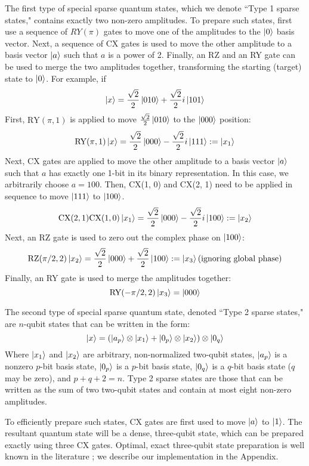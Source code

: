 \documentclass{article}
\begin{document}
The first type of special sparse quantum states, which we denote ``Type 1 sparse
states," contains exactly two non-zero
amplitudes. To prepare such states, first use a sequence of $RY(\pi)$ gates to
move one of the amplitudes to the $\mathinner{|{0}\rangle}$ basis vector. Next, a sequence of
CX gates is used to move the other amplitude to a basis vector $\mathinner{|{a}\rangle}$ such
that $a$ is a power of 2.
Finally, an RZ and an RY gate can be used to merge the two amplitudes together,
transforming the starting (target) state to $\mathinner{|{0}\rangle}$. For example, if
$$\mathinner{|{x}\rangle} = \frac{\sqrt{2}}{2}\mathinner{|{010}\rangle} + \frac{\sqrt{2}}{2}i\mathinner{|{101}\rangle}$$
First, $\text{RY}(\pi, 1)$ is applied to move 
$\frac{\sqrt{2}}{2}\mathinner{|{010}\rangle}$ to the $\mathinner{|{000}\rangle}$ position:
$$\text{RY}(\pi, 1) \mathinner{|{x}\rangle} = \frac{\sqrt{2}}{2}\mathinner{|{000}\rangle} 
- \frac{\sqrt{2}}{2}i\mathinner{|{111}\rangle} := \mathinner{|{x_1}\rangle}$$
Next, CX gates are applied to move the other amplitude to a basis vector
$\mathinner{|{a}\rangle}$ such that $a$ has exactly one 1-bit in its binary representation. In
this case, we arbitrarily choose $a = 100$. Then, CX(1, 0) and
CX(2, 1) need to be applied in sequence to move $\mathinner{|{111}\rangle}$ to $\mathinner{|{100}\rangle}$.
$$\text{CX}(2, 1) \text{CX}(1, 0) \mathinner{|{x_1}\rangle} = \frac{\sqrt{2}}{2}\mathinner{|{000}\rangle} 
- \frac{\sqrt{2}}{2}i\mathinner{|{100}\rangle} := \mathinner{|{x_2}\rangle}$$
Next, an RZ gate is used to zero out the complex phase on $\mathinner{|{100}\rangle}$:
$$\text{RZ}(\pi/2, 2)\mathinner{|{x_2}\rangle} = \frac{\sqrt{2}}{2}\mathinner{|{000}\rangle} 
+ \frac{\sqrt{2}}{2}\mathinner{|{100}\rangle} := \mathinner{|{x_3}\rangle}
\text{(ignoring global phase)}$$
Finally, an RY gate is used to merge the amplitudes together:
$$\text{RY}(-\pi/2, 2)\mathinner{|{x_3}\rangle} = \mathinner{|{000}\rangle}$$

The second type of special sparse quantum state, denoted ``Type 2 sparse states,"
are $n$-qubit states that can be written in the form:
\begin{equation} \label{type2sparse}
\mathinner{|{x}\rangle} = (\mathinner{|{a_p}\rangle} \otimes \mathinner{|{x_1}\rangle} + \mathinner{|{0_p}\rangle} \otimes \mathinner{|{x_2}\rangle})
  \otimes \mathinner{|{0_q}\rangle}
\end{equation}
Where $\mathinner{|{x_1}\rangle}$ and $\mathinner{|{x_2}\rangle}$ are arbitrary, non-normalized two-qubit states, $\mathinner{|{a_p}\rangle}$ is
a nonzero $p$-bit basis state, $\mathinner{|{0_p}\rangle}$ is a $p$-bit basis state,
$\mathinner{|{0_q}\rangle}$ is a $q$-bit basis state ($q$ may be zero), and $p + q + 2 = n$.
Type 2 sparse states are those that can be written as the sum of two two-qubit
states and contain at most eight non-zero amplitudes.

To efficiently prepare such states, CX gates are first used to move $\mathinner{|{a}\rangle}$ to
$\mathinner{|{1}\rangle}$. The resultant quantum state will be a dense, three-qubit state,
which can be prepared exactly using three CX gates. Optimal, exact three-qubit
state preparation is well known in the literature \cite{PhysRevA.77.032320}; 
we describe our implementation in the Appendix.
\end{document}
